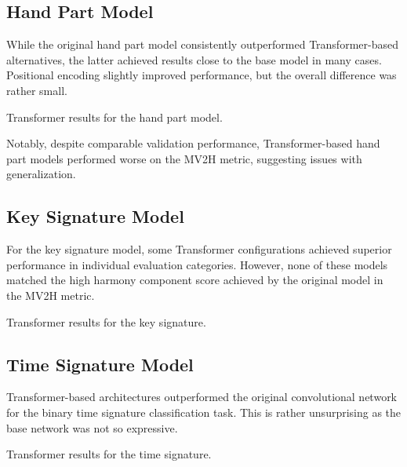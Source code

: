 \subsection{Hand Part Model}

While the original hand part model consistently outperformed Transformer-based alternatives, the latter achieved results close to the base model in many cases. Positional encoding slightly improved performance, but the overall difference was rather small.

\begin{table}[ht!]
\centering

\caption[Transformer results for the hand part model.]{Transformer results for the hand part model.}
\label{hand_part_transformer}
\end{table}

Notably, despite comparable validation performance, Transformer-based hand part models performed worse on the MV2H metric, suggesting issues with generalization.

\subsection{Key Signature Model}

For the key signature model, some Transformer configurations achieved superior performance in individual evaluation categories. However, none of these models matched the high harmony component score achieved by the original model in the MV2H metric.

\begin{table}[ht!]
\centering

\caption[Transformer results for the key signature.]{Transformer results for the key signature.}
\label{key_signature_transformer}
\end{table}

\subsection{Time Signature Model}

Transformer-based architectures outperformed the original convolutional network for the binary time signature classification task. This is rather unsurprising as the base network was not so expressive.

\begin{table}[ht!]
\centering

\caption[Transformer results for the time signature.]{Transformer results for the time signature.}
\label{time_signature_transformer}
\end{table}

